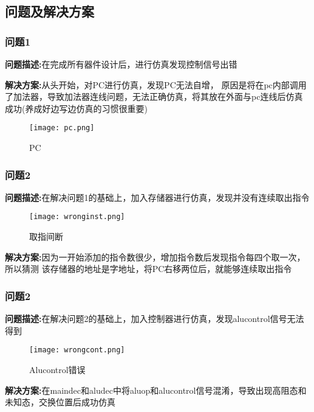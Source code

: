 \subsection{问题及解决方案}

\subsubsection{问题1}
\textbf{问题描述:}在完成所有器件设计后，进行仿真发现控制信号出错

\textbf{解决方案:}从头开始，对PC进行仿真，发现PC无法自增，
原因是将在pc内部调用了加法器，导致加法器连线问题，无法正确仿真，将其放在外面与pc连线后仿真成功(养成好边写边仿真的习惯很重要)

\begin{figure}[htbp]
    \centering
    \texttt{[image: pc.png]}
    \caption{PC}
\end{figure}

\subsubsection{问题2}
\textbf{问题描述:}在解决问题1的基础上，加入存储器进行仿真，发现并没有连续取出指令

\begin{figure}[htbp]
    \centering
    \texttt{[image: wronginst.png]}
    \caption{取指间断}
\end{figure}

\textbf{解决方案:}因为一开始添加的指令数很少，增加指令数后发现指令每四个取一次，所以猜测
该存储器的地址是字地址，将PC右移两位后，就能够连续取出指令

\subsubsection{问题2}
\textbf{问题描述:}在解决问题2的基础上，加入控制器进行仿真，发现alucontrol信号无法得到

\begin{figure}[htbp]
    \centering
    \texttt{[image: wrongcont.png]}
    \caption{Alucontrol错误}
\end{figure}

\textbf{解决方案:}在maindec和aludec中将aluop和alucontrol信号混淆，导致出现高阻态和未知态，交换位置后成功仿真